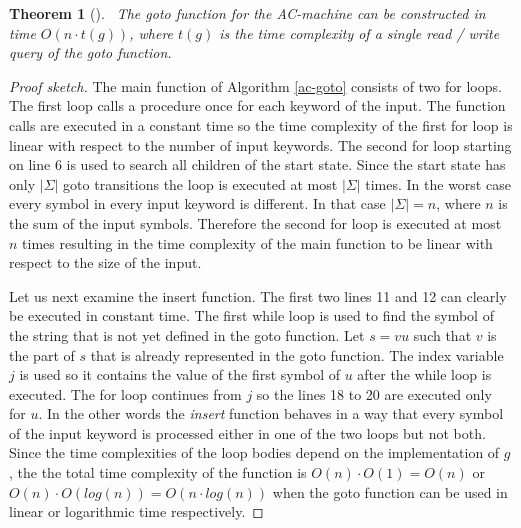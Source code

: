 \documentclass[english,twoside,censored,csm,algorithms-track-2020]{HYthesisML}
\theoremstyle{plain}
\newtheorem{theorem}{Theorem}[chapter]
\theoremstyle{definition}
\begin{document}
\begin{theorem}[]~\label{thm-time-goto}
  The goto function for the AC-machine can be constructed in time $O(n \cdot t(g))$,
  where $t(g)$ is the time complexity of a single read / write query of the
  goto function.
\end{theorem}
\begin{proof}[Proof sketch]
The main function of Algorithm \ref{ac-goto} consists of two for loops.
The first loop calls a procedure once for each keyword of the input. The function calls are
executed in a constant time so the time complexity of the first for loop is linear with respect
to the number of input keywords. The second for loop starting on line 6 is used to search all
children of the start state. Since the start state has only $|\Sigma|$ goto transitions the loop
is executed at most $|\Sigma|$ times. In the worst case every symbol
in every input keyword is different. In that case $|\Sigma| = n$, where $n$ is the sum of the input
symbols. Therefore the second for loop is executed at most $n$ times resulting in the time complexity of
the main function to be linear with respect to the size of the input.

Let us next examine the insert function. The first two lines 11 and 12 can clearly be executed in
constant time. The first while loop is used to find the symbol of the string that is not yet defined
in the goto function. Let $s=vu$ such that $v$ is the part of $s$ that is already represented in the
goto function. The index variable $j$ is used so it contains the value of the first symbol of $u$ after
the while loop is executed. The for loop continues from $j$ so the lines 18 to 20 are executed
only for $u$. In the other words the \textit{insert} function behaves in a way that every symbol of
the input keyword is processed either in one of the two loops but not both. Since the time complexities
of the loop bodies depend on the implementation of $g$, the the total time complexity of the function
is $O(n)\cdot O(1) = O(n)$ or $O(n)\cdot O(log(n)) = O(n\cdot log(n))$ when the goto function
can be used in linear or logarithmic time respectively.
\end{proof}
\end{document}
